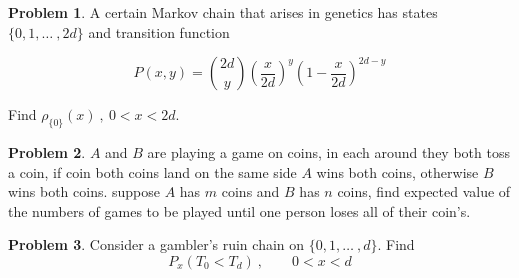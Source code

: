 \documentclass[12pt]{extreport}
\theoremstyle{definition}
\newtheorem{prob}{Problem}
\begin{document}
    \begin{prob}
        A certain Markov chain that arises in genetics has states \(\{0, 1, \dots\ , 2d\}\) and transition function

        \[P(x,y) = \binom{2d}{y}\left(\frac{x}{2d}\right)^y\left(1 - \frac{x}{2d}\right)^{2d-y}\]

        Find \(\rho_{\{0\}}(x) \ , \ 0 < x < 2d\).
    \end{prob}
    
    \begin{prob}
        $A$ and $B$ are playing a game on coins, in each around they both toss a coin, if coin both coins land on the same side $A$ wins both coins, otherwise $B$ wins both coins. suppose $A$ has $m$ coins and $B$ has $n$ coins, find expected value of the numbers of games to be played until one person loses all of their coin's. 
    \end{prob}
    
    \begin{prob}
        Consider a gambler's ruin chain on \(\{0, 1, \dots\ , d\}\). Find \[P_x\left(T_0 < T_d\right) \ , \qquad  0 < x < d\]
    \end{prob}
\end{document}
